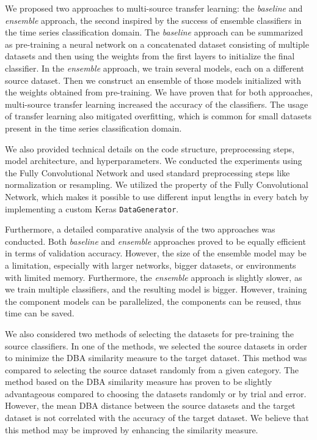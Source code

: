 \documentclass[a4paper,11pt,twoside]{report}
\theoremstyle{definition}
\begin{document}
We proposed two approaches to multi-source transfer learning: the \textit{baseline} and \textit{ensemble} approach, the second inspired by the success of ensemble classifiers in the time series classification domain. The \textit{baseline} approach can be summarized as pre-training a neural network on a concatenated dataset consisting of multiple datasets and then using the weights from the first layers to initialize the final classifier. In the \textit{ensemble} approach, we train several models, each on a different source dataset. Then we construct an ensemble of those models initialized with the weights obtained from pre-training. We have proven that for both approaches, multi-source transfer learning increased the accuracy of the classifiers. The usage of transfer learning also mitigated overfitting, which is common for small datasets present in the time series classification domain.

We also provided technical details on the code structure, preprocessing steps, model architecture, and hyperparameters. We conducted the experiments using the Fully Convolutional Network and used standard preprocessing steps like normalization or resampling. We utilized the property of the Fully Convolutional Network, which makes it possible to use different input lengths in every batch by implementing a custom Keras \texttt{DataGenerator}.

Furthermore, a detailed comparative analysis of the two approaches was conducted. Both \textit{baseline} and \textit{ensemble} approaches proved to be equally efficient in terms of validation accuracy. However, the size of the ensemble model may be a limitation, especially with larger networks, bigger datasets, or environments with limited memory. Furthermore, the \textit{ensemble} approach is slightly slower, as we train multiple classifiers, and the resulting model is bigger. However, training the component models can be parallelized, the components can be reused, thus time can be saved.


We also considered two methods of selecting the datasets for pre-training the source classifiers. In one of the methods, we selected the source datasets in order to minimize the DBA similarity measure to the target dataset. This method was compared to selecting the source dataset randomly from a given category. The method based on the DBA similarity measure has proven to be slightly advantageous compared to choosing the datasets randomly or by trial and error. However, the mean DBA distance between the source datasets and the target dataset is not correlated with the accuracy of the target dataset. We believe that this method may be improved by enhancing the similarity measure.
\end{document}
